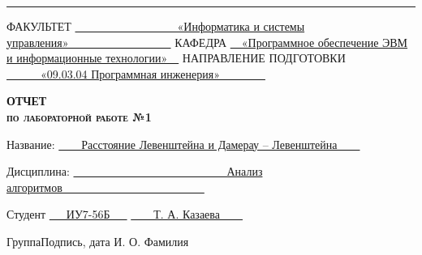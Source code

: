 \begin{titlepage}
\noindent\rule{18cm}{1.5pt}

\vspace{8mm}

\noindent\textnormal{ФАКУЛЬТЕТ}\hspace{5mm} \underline{\textnormal{~~~~~~~~~~~~~~~~~~«Информатика и системы управления»~~~~~~~~~~~~~~~~~~}} \newline\newline
\textnormal{КАФЕДРА}\hspace{5mm} \underline{\textnormal{~~«Программное обеспечение ЭВМ и информационные технологии»~~}}
\newline\newline
\textnormal{НАПРАВЛЕНИЕ ПОДГОТОВКИ}\hspace{5mm} \underline{\textnormal{~~~~~~«09.03.04 Программная инженерия»~~~~~~~~}}

\vspace{2.5cm}

\begin{center}
	\Large\textbf{\textsc{ОТЧЕТ}}\\
	\Large\textbf{\textsc{по лабораторной работе №1}}\\
\end{center}

\vspace{1cm}

\noindent\textnormal{Название:} \hspace{15mm} \underline{\textnormal{~~~~Расстояние Левенштейна и Дамерау -- Левенштейна~~~~}}\noindent

\vspace{1.3cm}

\noindent\textnormal{Дисциплина:} \hspace{10mm} \underline{\textnormal{~~~~~~~~~~~~~~~~~~~~~~~~~~~Анализ алгоритмов~~~~~~~~~~~~~~~~~~~~~~~~~}}\noindent

\vspace{2cm}

\noindent\textnormal{Студент} \hspace{17mm}
\underline{\textnormal{{~~~ИУ7-56Б~~~}}}
\hspace{20mm}
\underline{\textnormal{\hphantom{~~~~~~~~~~~~~~~~~~~~~~~~~~~}}} \hspace{15mm}
\underline{\textnormal{~~~~Т. А. Казаева~~~~}}

\vspace{2mm}
\noindent\textnormal{\hphantom{Студент}} \hspace{23mm}\noindent
\fontsize{8pt}{8pt}
\textnormal{Группа}\hspace{40mm}\textnormal{Подпись, дата} \hspace{30mm}\noindent\textnormal{И. О. Фамилия}


\end{titlepage}
